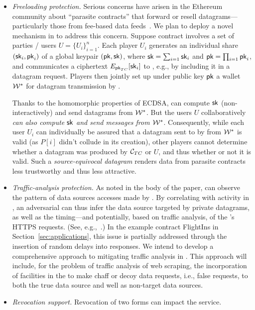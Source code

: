 \begin{itemize}
\item{\em Freeloading protection.} Serious concerns have  arisen in the Ethereum community about ``parasite contracts'' that forward or resell datagrams---particularly those from fee-based data feeds~\cite{parasite}. We plan to deploy a novel mechanism in \tc to address this concern. Suppose contract \reqcont involves a set of parties / users $U = \{U_i\}_{i=1}^n$. Each player $U_i$ generates an individual share $({\sf sk}_i, {\sf pk}_i)$ of a global keypair $({\sf pk}, {\sf sk})$, where ${\sf sk} = \sum_{i=1} {\sf sk}_i$ and ${\sf pk} = \prod_{i=1} {\sf pk}_i$, and communicates a ciphertext $E_{{\sf pk}_{TC}}[{\sf sk}_i]$ to \tcont, e.g., by including it in a datagram request. Players then jointly set  up under public key ${\sf pk}$ a wallet ${\cal W}^*$ for datagram transmission by \tcont. 

Thanks to the homomorphic properties of ECDSA, \tcont can compute ${\sf sk}$ (non-interactively) and send datagrams from ${\cal W}^*$. But the users $U$ collaboratively \emph{can also compute ${\sf sk}$ and send messages from ${\cal W}^*$}. Consequently, while each user $U_i$ can individually be assured that a datagram sent to \reqcont by \tcont from ${\cal W}^*$ is valid (as $P[i]$ didn't collude in its creation), other players cannot determine whether a datagram was produced by ${\cal C}_{TC}$ or $U$, and thus whether or not it is valid. Such a \emph{source-equivocal datagram} renders data from parasite contracts less trustworthy and thus less attractive. 
\item{\em Traffic-analysis protection.} As noted in the body of the paper, \medname can observe the pattern of data sources accesses made by \tc. By correlating with activity in \tcont, an adversarial \medname can thus infer the data source targeted by private datagrams, as well as the timing---and potentially, based on traffic analysis, of the \encname's HTTPS requests. (See, e.g.,~\cite{chen2010side}.) In the example contract {\sf FlightIns} in Section~\ref{sec:applications}, this issue is partially addressed through the insertion of random delays into \tc responses. We intend to develop a comprehensive approach to mitigating traffic analysis in \tc. This approach will include, for the problem of traffic analysis of web scraping, the incorporation of facilities in the \encname to make chaff or decoy data requests, i.e., false requests, to both the true data source and well as non-target data sources. 

\item{\em Revocation support.} Revocation of two forms can impact the \tc service. 


\end{itemize}
